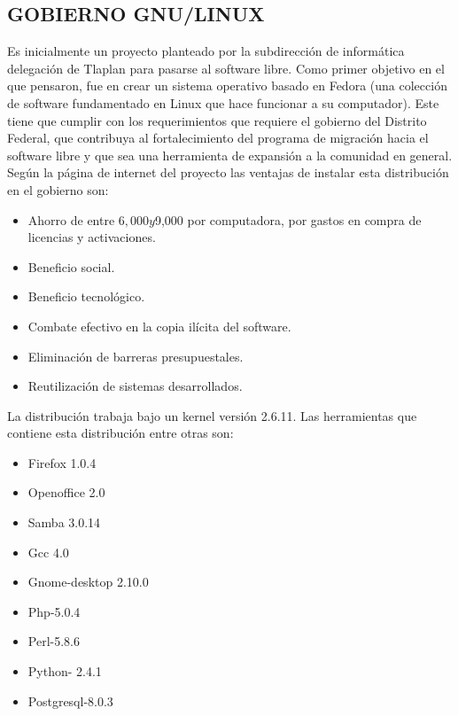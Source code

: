 \subsection*{GOBIERNO GNU/LINUX}
Es inicialmente un proyecto planteado por la subdirección de
informática delegación de Tlaplan para pasarse al software libre.
Como primer objetivo en el que pensaron, fue en crear un 
sistema operativo basado en Fedora (una colección de software
fundamentado en Linux que hace funcionar a su computador).
Este tiene que cumplir con los requerimientos que requiere el
gobierno del Distrito Federal, que contribuya al fortalecimiento
del programa de migración hacia el software libre y que sea una
herramienta de expansión a la comunidad en general.
Según la página de internet del proyecto las ventajas de instalar
esta distribución en el gobierno son:
\begin{itemize}
  \item Ahorro de entre $6,000 y $9,000 por computadora, por
	gastos en compra de licencias y activaciones.
  \item Beneficio social.
  \item Beneficio tecnológico.
  \item Combate efectivo en la copia ilícita del software.
  \item Eliminación de barreras presupuestales.
  \item Reutilización de sistemas desarrollados.
\end{itemize}
La distribución trabaja bajo un kernel versión 2.6.11. Las
herramientas que contiene esta distribución entre otras
son:
\begin{itemize}
  \item Firefox 1.0.4
  \item Openoffice 2.0
  \item Samba 3.0.14
  \item Gcc 4.0
  \item Gnome-desktop 2.10.0
  \item Php-5.0.4
  \item Perl-5.8.6
  \item Python- 2.4.1
  \item Postgresql-8.0.3
\end{itemize}
 
